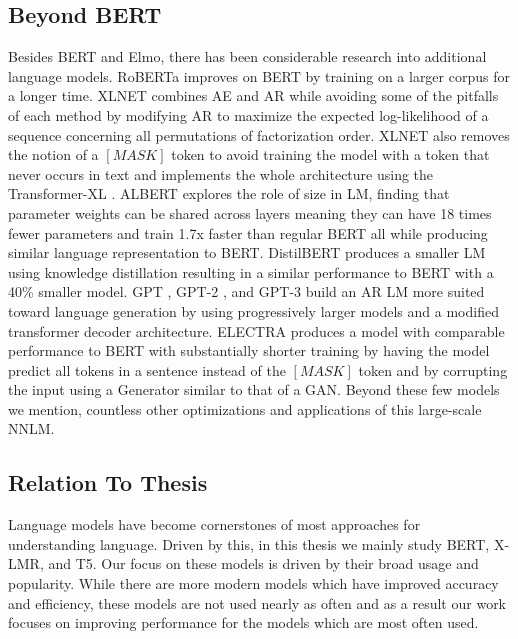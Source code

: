 \subsection{Beyond BERT}
Besides BERT and Elmo, there has been considerable research into additional language models. RoBERTa \cite{Liu2019RoBERTaAR} improves on BERT by training on a larger corpus for a longer time. XLNET \cite{Yang2019XLNetGA} combines AE and AR while avoiding some of the pitfalls of each method by modifying AR to maximize the expected log-likelihood of a sequence concerning all permutations of factorization order. XLNET also removes the notion of a $[MASK]$ token to avoid training the model with a token that never occurs in text and implements the whole architecture using the Transformer-XL \cite{Dai2019TransformerXLAL}. ALBERT \cite{Lan2019ALBERTAL} explores the role of size in LM, finding that parameter weights can be shared across layers meaning they can have 18 times fewer parameters and train 1.7x faster than regular BERT all while producing similar language representation to BERT. DistilBERT \cite{Sanh2019DistilBERTAD} produces a smaller LM using knowledge distillation resulting in a similar performance to BERT with a 40\% smaller model. GPT \cite{Radford2018ImprovingLU}, GPT-2 \cite{Radford2019LanguageMA}, and GPT-3 \cite{Brown2020LanguageMA}  build an AR LM more suited toward language generation by using progressively larger models and a modified transformer decoder architecture. ELECTRA \cite{Clark2020ELECTRAPT} produces a model with comparable performance to BERT with substantially shorter training by having the model predict all tokens in a sentence instead of the $[MASK]$ token and by corrupting the input using a Generator similar to that of a GAN. Beyond these few models we mention, countless other optimizations and applications of this large-scale NNLM. 
\subsection{Relation To Thesis}
Language models have become cornerstones of most approaches for understanding language. Driven by this, in this thesis we mainly study BERT, X-LMR, and T5. Our focus on these models is driven by their broad usage and popularity. While there are more modern models which have improved accuracy and efficiency, these models are not used nearly as often and as a result our work focuses on improving performance for the models which are most often used. 
